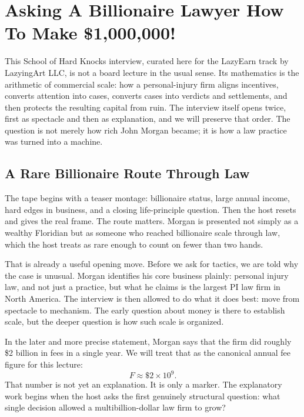 \chapter{Asking A Billionaire Lawyer How To Make \$1{,}000{,}000!}

This School of Hard Knocks interview, curated here for the LazyEarn track by LazyingArt LLC, is not a board lecture in the usual sense. Its mathematics is the arithmetic of commercial scale: how a personal-injury firm aligns incentives, converts attention into cases, converts cases into verdicts and settlements, and then protects the resulting capital from ruin. The interview itself opens twice, first as spectacle and then as explanation, and we will preserve that order. The question is not merely how rich John Morgan became; it is how a law practice was turned into a machine.

\section{A Rare Billionaire Route Through Law}

The tape begins with a teaser montage: billionaire status, large annual income, hard edges in business, and a closing life-principle question. Then the host resets and gives the real frame. The route matters. Morgan is presented not simply as a wealthy Floridian but as someone who reached billionaire scale through law, which the host treats as rare enough to count on fewer than two hands.

That is already a useful opening move. Before we ask for tactics, we are told why the case is unusual. Morgan identifies his core business plainly: personal injury law, and not just a practice, but what he claims is the largest PI law firm in North America. The interview is then allowed to do what it does best: move from spectacle to mechanism. The early question about money is there to establish scale, but the deeper question is how such scale is organized.

In the later and more precise statement, Morgan says that the firm did roughly \$2 billion in fees in a single year. We will treat that as the canonical annual fee figure for this lecture:
\begin{equation}
F \approx \$2 \times 10^9.
\end{equation}
That number is not yet an explanation. It is only a marker. The explanatory work begins when the host asks the first genuinely structural question: what single decision allowed a multibillion-dollar law firm to grow?

